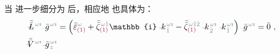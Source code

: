 当  进一步细分为  后，相应地  也具体为：
\begin{subequations} \label{eq:nonlinear(2)-wave_wkrho-simplify6''}
\begin{align}
	\!\!\!\! \Xint{\mathcolor{gray}{-}}{32}{\bar{\bar{L}}}^{\;\! \mathcolor{gray}{\omega} \textcolor{ForestGreen}{\imath}} \Xint{{}^{}_{\mathcolor{gray}{-}}}{10}{\bar{g}}^{\;\!\mathcolor{gray}{\omega} \textcolor{ForestGreen}{\imath}} &= \left( \bar{\bar{\varepsilon}}^{\;\! \mathcolor{gray}{\omega}}_{\textcolor{Maroon}{(1)}} + \bar{\bar{\zeta}}^{\;\! \mathcolor{gray}{\omega} \mathcolor{gray}{\check{1}}}_{\textcolor{Maroon}{(1)}} \mathbb{i} \Xint{\begin{smallmatrix} ~ \\ {}^{}_{\mathcolor{gray}{-}} \\ ~ \end{smallmatrix}}{15}{k}_{\;\! \mathcolor{gray}{\check{1}}}^{\;\! \mathcolor{gray}{\omega} \textcolor{ForestGreen}{\imath}} - \bar{\bar{\zeta}}^{\;\! \mathcolor{gray}{\omega} \mathcolor{gray}{\check{1} \check{2}}}_{\textcolor{Maroon}{(1)}} \Xint{\begin{smallmatrix} ~ \\ {}^{}_{\mathcolor{gray}{-}} \\ ~ \end{smallmatrix}}{15}{k}_{\;\! \mathcolor{gray}{\check{2}}}^{\;\! \mathcolor{gray}{\omega} \textcolor{ForestGreen}{\imath}} \Xint{\begin{smallmatrix} ~ \\ {}^{}_{\mathcolor{gray}{-}} \\ ~ \end{smallmatrix}}{15}{k}_{\;\! \mathcolor{gray}{\check{1}}}^{\;\! \mathcolor{gray}{\omega} \textcolor{ForestGreen}{\imath}} \right) \Xint{{}^{}_{\mathcolor{gray}{-}}}{10}{\bar{g}}^{\;\!\mathcolor{gray}{\omega} \textcolor{ForestGreen}{\imath}} = \bar{0} ~, \label{eq:nonlinear(2)-wave_wkrho-simplify6-L3''} \\
	\!\!\!\! \Xint{\mathcolor{gray}{-}}{25}{\bar{\bar{V}}}^{\;\! \mathcolor{gray}{\omega} \textcolor{ForestGreen}{\imath}} \Xint{{}^{}_{\mathcolor{gray}{-}}}{10}{\bar{g}}^{\;\!\mathcolor{gray}{\omega} \textcolor{ForestGreen}{\imath}}_{\;\! \mathcolor{gray}{z}}

\end{align}
\end{subequations}
